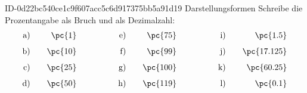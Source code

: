 \begin{exercise}
      {ID-0d22bc540ce1c9f607acc5c6d917375bb5a91d19}
      {Darstellungsformen}
  \ifproblem\problem
    Schreibe die Prozentangabe als Bruch und als Dezimalzahl:
    \begin{alignat*}{6}
      \text{a)}&\quad & \text{\pc{1}}&\qquad\qquad  & \text{e)}&\quad & \text{\pc{75}}&\qquad\qquad  & \text{i)}&\quad & \text{\pc{1.5}}&    \\[1ex]
      \text{b)}&\quad & \text{\pc{10}}&\qquad\qquad & \text{f)}&\quad & \text{\pc{99}}&\qquad\qquad  & \text{j)}&\quad & \text{\pc{17.125}}& \\[1ex]
      \text{c)}&\quad & \text{\pc{25}}&\qquad\qquad & \text{g)}&\quad & \text{\pc{100}}&\qquad\qquad & \text{k)}&\quad & \text{\pc{60.25}}&  \\[1ex]
      \text{d)}&\quad & \text{\pc{50}}&\qquad\qquad & \text{h)}&\quad & \text{\pc{119}}&\qquad\qquad & \text{l)}&\quad & \text{\pc{0.1}}&
    \end{alignat*}
  \fi
\end{exercise}

